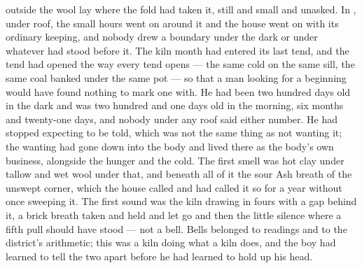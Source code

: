 
 outside the wool lay where the fold had taken it, still and small and unasked. In , under  roof, the small hours went on around it and the house went on with its ordinary keeping, and nobody drew a boundary under the dark or under whatever had stood before it. The kiln month had entered its last tend, and the tend had opened the way every tend opens --- the same cold on the same sill, the same coal banked under the same pot --- so that a man looking for a beginning would have found nothing to mark one with. He had been two hundred days old in the dark and was two hundred and one days old in the morning, six months and twenty-one days, and nobody under any roof said either number. He had stopped expecting to be told, which was not the same thing as not wanting it; the wanting had gone down into the body and lived there as the body's own business, alongside the hunger and the cold. The first smell was hot clay under tallow and wet wool under that, and beneath all of it the sour Ash breath of the unswept corner, which the house called  and had called it so for a year without once sweeping it. The first sound was the kiln drawing in fours with a gap behind it, a brick breath taken and held and let go and then the little silence where a fifth pull should have stood --- not a bell. Bells belonged to readings and to the district's arithmetic; this was a kiln doing what a kiln does, and the boy had learned to tell the two apart before he had learned to hold up his head.

